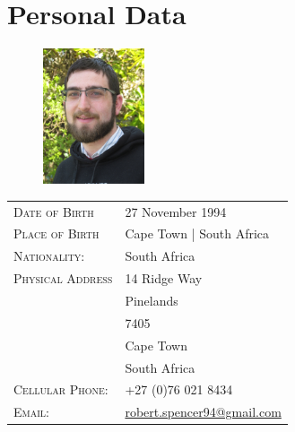 \section{Personal Data}

\begin{figure}
\vspace{-66pt}
\begin{center}
  \includegraphics[width=3.0cm]{profile2}
\end{center}
\end{figure}
\begin{tabular}{R{5cm}|l}
\textsc{Date of Birth} & 27 November 1994 \\
\textsc{Place of Birth} & Cape Town | South Africa\\
\textsc{Nationality:} & South Africa\\
\textsc{Physical Address} & 14 Ridge Way\\
&Pinelands\\
&7405\\
&Cape Town\\
&South Africa\\
\textsc{Cellular Phone:} & +27 (0)76 021 8434\\
\textsc{Email:} & \href{mailto:robert.spencer94@gmail.com}{robert.spencer94@gmail.com}
\end{tabular}


\vspace{10pt}
